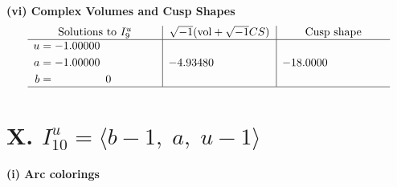 \documentclass[1p]{elsarticle_modified}
\theoremstyle{definition}
\newcommand{\I}{\sqrt{-1}}
\begin{document}
\newpage\flushleft \textbf{(vi) Complex Volumes and Cusp Shapes}
$$\begin{array}{c|c|c}  
\text{Solutions to }I^u_{9}& \I (\text{vol} + \sqrt{-1}CS) & \text{Cusp shape}\\
 \hline 
\begin{aligned}
u &= -1.00000\phantom{ +0.000000I} \\
a &= -1.00000\phantom{ +0.000000I} \\
b &= \phantom{-0.000000 } 0\end{aligned}
 & -4.93480\phantom{ +0.000000I} & -18.0000\phantom{ +0.000000I}\\
 \hline 
 \end{array}$$\newpage\newpage\renewcommand{\arraystretch}{1}
\centering \section*{X. $I^u_{10}= \langle b-1,\;a,\;u-1 \rangle$}
\flushleft \textbf{(i) Arc colorings}\\
\end{document}
